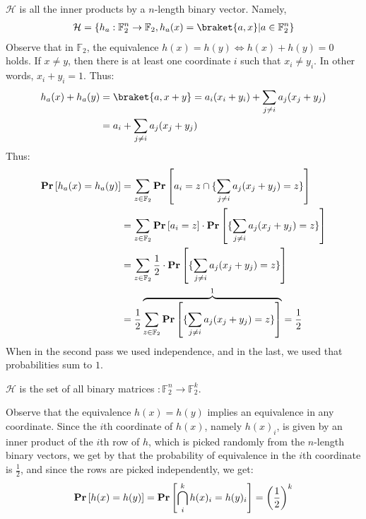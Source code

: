 \begin{example}
  \label{example:vec}
  $\mathcal{H}$ is all the inner products by a $n$-length binary vector. Namely, 
  \begin{equation*}
    \begin{split}
  \mathcal{H} = \{ h_{a} :  \mathbb{F}_{2}^{n} \rightarrow \mathbb{F}_2, h_{a}(x) = \braket{a,x} | a \in  \mathbb{F}_{2}^{n}\}
    \end{split}
  \end{equation*}
Observe that in $\mathbb{F}_{2}$, the equivalence $h(x) = h(y) \Leftrightarrow h(x) + h(y) = 0$ holds. If $x \neq y$, then there is at least one coordinate $i$ such that $x_{i} \neq y_{i}$. In other words, $x_{i} + y_{i} = 1$. Thus:
  \begin{equation*}
    \begin{split}
      h_{a}(x) + h_{a}(y) &=  \braket{a, x +y } = a_{i}(x_{i} + y_{i})  +  \sum_{j \neq i } a_{j}( x_{j} + y_{j}) \\ 
      & = a_{i} +  \sum_{j \neq i } a_{j}( x_{j} + y_{j}) 
    \end{split}
  \end{equation*}
  Thus: 
  \begin{equation*}
    \begin{split}
      \mathbf{Pr} \left[  h_{a}(x) = h_{a}(y)   \right] &=  \sum_{z \in \mathbb{F}_{2} } \mathbf{Pr} \left[    a_{i} = z \cap  \{ \sum_{j \neq i } a_{j}( x_{j} + y_{j}) = z \}   \right] \\
    &=  \sum_{z \in \mathbb{F}_{2} } \mathbf{Pr} \left[    a_{i} = z  \right] \cdot \mathbf{Pr} \left[  \{ \sum_{j \neq i } a_{j}( x_{j} + y_{j}) = z \}   \right] \\
    &=   \sum_{z \in \mathbb{F}_{2}} \frac{1}{2} \cdot \mathbf{Pr} \left[  \{ \sum_{j \neq i } a_{j}( x_{j} + y_{j}) = z \}   \right] \\
    &=   \frac{1}{2}\overbrace{\sum_{z \in \mathbb{F}_{2}} \mathbf{Pr} \left[  \{ \sum_{j \neq i } a_{j}( x_{j} + y_{j}) = z \}   \right] }^{ 1}  = \frac{1}{2}
    \end{split}
  \end{equation*}
When in the second pass we used independence, and in the last, we used that probabilities sum to $1$.
\end{example}
\begin{example}
  $\mathcal{H}$ is the set of all binary matrices $ : \mathbb{F}_{2}^{n} \rightarrow \mathbb{F}_{2}^{k}$.

Observe that the equivalence $h(x) = h(y)$ implies an equivalence in any coordinate. Since the $i$th coordinate of $h(x)$, namely $h(x)_{i}$, is given by an inner product of the $i$th row of $h$, which is picked randomly from the $n$-length binary vectors, we get by  that the probability of equivalence in the $i$th coordinate is $\frac{1}{2}$, and since the rows are picked independently, we get:
  \begin{equation*}
    \begin{split}
      \mathbf{Pr} \left[  h(x) = h(y) \right] = \mathbf{Pr} \left[  \bigcap_{i}^{k} h(x)_{i} = h(y)_{i} \right]  = \left( \frac{1}{2} \right)^{k}
    \end{split}
  \end{equation*}
\end{example}

